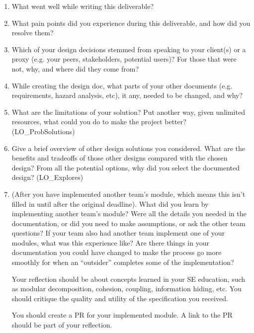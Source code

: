 \documentclass[12pt, titlepage]{article}
\begin{document}
\begin{enumerate}
  \item What went well while writing this deliverable? 
  \item What pain points did you experience during this deliverable, and how
    did you resolve them?
  \item Which of your design decisions stemmed from speaking to your client(s)
  or a proxy (e.g. your peers, stakeholders, potential users)? For those that
  were not, why, and where did they come from?
  \item While creating the design doc, what parts of your other documents (e.g.
  requirements, hazard analysis, etc), it any, needed to be changed, and why?
  \item What are the limitations of your solution?  Put another way, given
  unlimited resources, what could you do to make the project better? (LO\_ProbSolutions)
  \item Give a brief overview of other design solutions you considered.  What
  are the benefits and tradeoffs of those other designs compared with the chosen
  design?  From all the potential options, why did you select the documented design?
  (LO\_Explores)
  \item (After you have implemented another team's module, which means this
  isn't filled in until after the original deadline). What did you learn by
  implementing another team's module? Were all the details you needed in the
  documentation, or did you need to make assumptions, or ask the other team
  questions?  If your team also had another team implement one of your modules,
  what was this experience like?  Are there things in your documentation you
  could have changed to make the process go more smoothly for when an
  ``outsider'' completes some of the implementation?

  Your reflection should be about concepts learned in your SE education, such as modular decomposition, cohesion, coupling, information hiding, etc.  You should critique the quality and utility of the specification you received.

  You should create a PR for your implemented module.  A link to the PR should be part of your reflection.

\end{enumerate}
\end{document}
